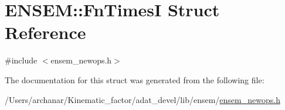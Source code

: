 \hypertarget{structENSEM_1_1FnTimesI}{}\section{E\+N\+S\+EM\+:\+:Fn\+TimesI Struct Reference}
\label{structENSEM_1_1FnTimesI}


{\ttfamily \#include $<$ensem\+\_\+newops.\+h$>$}



The documentation for this struct was generated from the following file\+:\begin{DoxyCompactItemize}
\item 
/\+Users/archanar/\+Kinematic\+\_\+factor/adat\+\_\+devel/lib/ensem/\mbox{\hyperlink{lib_2ensem_2ensem__newops_8h}{ensem\+\_\+newops.\+h}}\end{DoxyCompactItemize}
